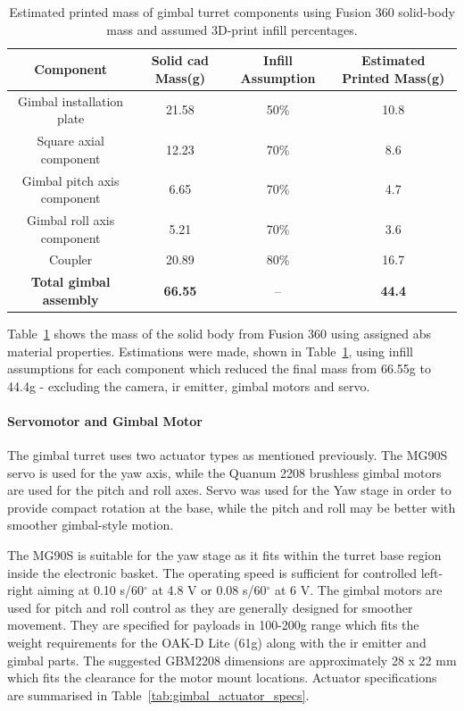 \documentclass{report_template_oxford}
\begin{document}
\begin{table}[htbp]
\centering
\caption{Estimated printed mass of gimbal turret components using Fusion 360 solid-body mass and assumed 3D-print infill percentages.}
\label{tab:gimbal_mass_estimate}
\renewcommand{\arraystretch}{1.15}
\begin{tabular}{|c|c|c|c|}
\hline
\textbf{Component} & \textbf{Solid \gls{cad} Mass(g)} & \textbf{Infill Assumption} & \textbf{Estimated Printed Mass(g)} \\
\hline
Gimbal installation plate & 21.58  & 50\% & 10.8  \\
Square axial component & 12.23  & 70\% & 8.6  \\
Gimbal pitch axis component & 6.65  & 70\% & 4.7  \\
Gimbal roll axis component & 5.21  & 70\% & 3.6  \\
Coupler & 20.89  & 80\% & 16.7  \\
\hline
\textbf{Total gimbal assembly} & \textbf{66.55} & -- & \textbf{44.4} \\
\hline
\end{tabular}
\end{table}

Table~\ref{tab:gimbal_mass_estimate} shows the mass of the solid body from Fusion 360 using assigned \gls{abs} material properties. Estimations were made, shown in Table~\ref{tab:gimbal_mass_estimate}, using infill assumptions for each component which reduced the final mass from 66.55g to 44.4g - excluding the camera, \gls{ir} emitter, gimbal motors and servo. 

\paragraph{Servomotor and Gimbal Motor}

The gimbal turret uses two actuator types as mentioned previously. The MG90S servo is used for the yaw axis, while the Quanum 2208 brushless gimbal motors are used for the pitch and roll axes. Servo was used for the Yaw stage in order to provide compact rotation at the base, while the pitch and roll may be better with smoother gimbal-style motion. 

The MG90S is suitable for the yaw stage as it fits within the turret base region inside the electronic basket. The operating speed is sufficient for controlled left-right aiming at 0.10 s/60$^\circ$ at 4.8 V or 0.08 s/60$^\circ$ at 6 V. The gimbal motors are used for pitch and roll control as they are generally designed for smoother movement. They are specified for payloads in 100-200g range which fits the weight requirements for the OAK-D Lite (61g) along with the \gls{ir} emitter and gimbal parts. The suggested GBM2208 dimensions are approximately 28 x 22 mm which fits the clearance for the motor mount locations. Actuator specifications are summarised in Table~\ref{tab:gimbal_actuator_specs}.
\end{document}
